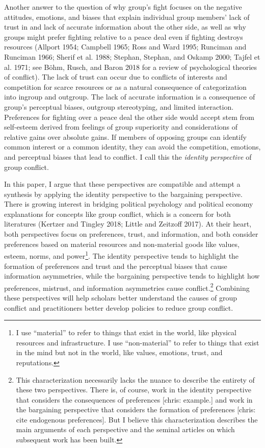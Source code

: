 \documentclass[11pt]{article}
\begin{document}
Another answer to the question of why group's fight focuses on the
negative attitudes, emotions, and biases that explain individual group
members' lack of trust in and lack of accurate information about the
other side, as well as why groups might prefer fighting relative to a
peace deal even if fighting destroys resources (Allport 1954; Campbell
1965; Ross and Ward 1995; Runciman and Runciman 1966; Sherif et al.
1988; Stephan, Stephan, and Oskamp 2000; Tajfel et al. 1971; see Böhm,
Rusch, and Baron 2018 for a review of psychological theories of
conflict). The lack of trust can occur due to conflicts of interests and
competition for scarce resources or as a natural consequence of
categorization into ingroup and outgroup. The lack of accurate
information is a consequence of group's perceptual biases, outgroup
stereotyping, and limited interaction. Preferences for fighting over a
peace deal the other side would accept stem from self-esteem derived
from feelings of group superiority and considerations of relative gains
over absolute gains. If members of opposing groups can identify common
interest or a common identity, they can avoid the competition, emotions,
and perceptual biases that lead to conflict. I call this the
\emph{identity perspective} of group conflict.

In this paper, I argue that these perspectives are compatible and
attempt a synthesis by applying the identity perspective to the
bargaining perspective. There is growing interest in bridging political
psychology and political economy explanations for concepts like group
conflict, which is a concern for both literatures (Kertzer and Tingley
2018; Little and Zeitzoff 2017). At their heart, both perspectives focus
on preferences, trust, and information, and both consider preferences
based on material resources and non-material goods like values, esteem,
norms, and power\footnote{I use ``material'' to refer to things that
  exist in the world, like physical resources and infrastructure. I use
  ``non-material'' to refer to things that exist in the mind but not in
  the world, like values, emotions, trust, and reputations.}. The
identity perspective tends to highlight the formation of preferences and
trust and the perceptual biases that cause information asymmetries,
while the bargaining perspective tends to highlight how preferences,
mistrust, and information asymmetries cause conflict.\footnote{This
  characterization necessarily lacks the nuance to describe the entirety
  of these two perspectives. There is, of course, work in the identity
  perspective that considers the consequences of preferences {[}chris:
  example.{]} and work in the bargaining perspective that considers the
  formation of preferences {[}chris: cite endogenous preferences{]}. But
  I believe this characterization describes the main arguments of each
  perspective and the seminal articles on which subsequent work has been
  built.} Combining these perspectives will help scholars better
understand the causes of group conflict and practitioners better develop
policies to reduce group conflict.
\end{document}
